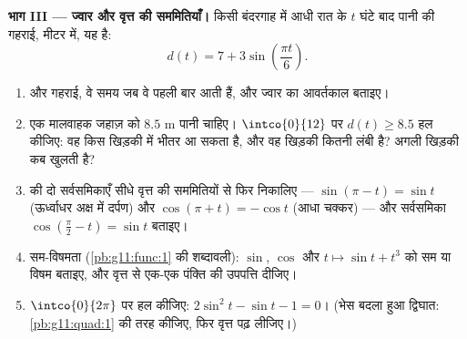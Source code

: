 \begin{problem}
\medskip
\noindent\textbf{भाग III --- ज्वार और वृत्त की सममितियाँ।}
किसी बंदरगाह में आधी रात के $t$ घंटे बाद पानी की गहराई, मीटर में, यह है:
\[
d(t) = 7 + 3 \sin\!\left(\frac{\pi t}{6}\right).
\]
\begin{enumerate}[resume]
  \item {} और  गहराई, वे समय जब वे पहली बार आती हैं, और ज्वार का
        आवर्तकाल बताइए।
  \item एक मालवाहक जहाज़ को $8.5$ m पानी चाहिए। $\intco{0}{12}$ पर $d(t) \geq 8.5$ हल कीजिए: वह
        किस खिड़की में भीतर आ सकता है, और वह खिड़की कितनी लंबी है? अगली
        खिड़की कब खुलती है?
  \item {} की दो सर्वसमिकाएँ सीधे वृत्त की सममितियों से फिर
        निकालिए --- $\sin(\pi - t) = \sin t$ (ऊर्ध्वाधर अक्ष में दर्पण) और $\cos(\pi + t) = -\cos t$ (आधा चक्कर)
        --- और  सर्वसमिका $\cos\left(\frac\pi2 - t\right) = \sin t$ बताइए।
  \item सम-विषमता (\cref{pb:g11:func:1} की शब्दावली): $\sin$, $\cos$ और $t \mapsto \sin t + t^3$ को सम या विषम
        बताइए, और वृत्त से एक-एक पंक्ति की उपपत्ति दीजिए।
  \item $\intco{0}{2\pi}$ पर हल कीजिए: $2\sin^2 t - \sin t - 1 = 0$। (भेस बदला हुआ द्विघात: \cref{pb:g11:quad:1} की तरह
         कीजिए, फिर वृत्त पढ़ लीजिए।)
\end{enumerate}


\end{problem}
